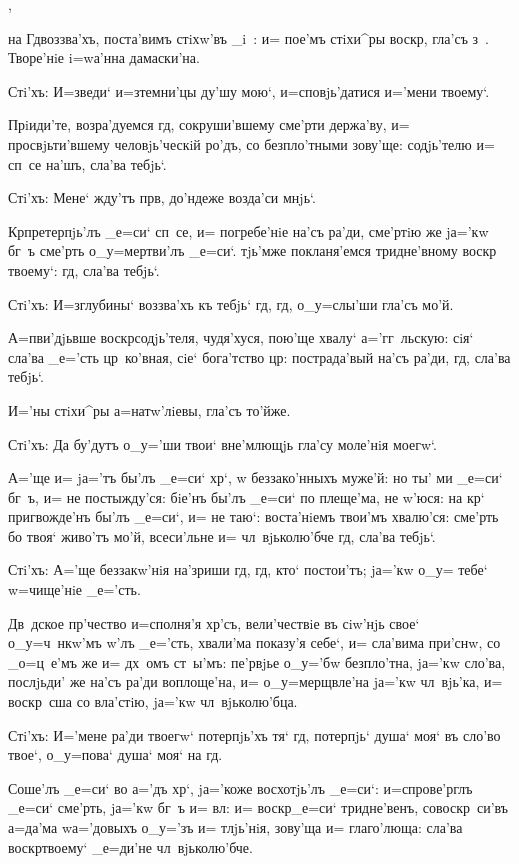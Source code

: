 ,

на Гд воззва'хъ, поста'вимъ стiхw'въ _i~: и= пое'мъ 
стiхи^ры воскр, гла'съ з~. Творе'нiе i=wа'нна 
дамаски'на.

Стi'хъ: И=зведи` и=з\ъ темни'цы ду'шу мою`, 
и=сповjь'датися и='мени твоему`.

Прiиди'те, возра'дуемся гд, сокруши'вшему сме'рти 
держа'ву, и= просвjьти'вшему человjь'ческiй ро'дъ, со 
безпло'тными зову'ще: содjь'телю и= сп~се на'шъ, сла'ва 
тебjь`.

Стi'хъ: Мене` жду'тъ прв, до'ндеже возда'си 
мнjь`.

Кр претерпjь'лъ _е=си` сп~се, и= погребе'нiе на'съ 
ра'ди, сме'ртiю же jа='кw бг~ъ сме'рть о_у=мертви'лъ 
_е=си`. тjь'мже покланя'емся тридне'вному воскр 
твоему`: гд, сла'ва тебjь`.

Стi'хъ: И=з\ъ глубины` воззва'хъ къ тебjь` гд, 
гд, о_у=слы'ши гла'съ мо'й.

А=п ви'дjьвше воскр содjь'теля, чудя'хуся, 
пою'ще хвалу` а='гг~льскую: сiя` сла'ва _е='сть 
цр~ко'вная, сiе` бога'тство цр: пострада'вый на'съ 
ра'ди, гд, сла'ва тебjь`.

И='ны стiхи^ры а=натw'лiевы, гла'съ то'йже.

Стi'хъ: Да бу'дутъ о_у='ши твои` вне'млющjь гла'су 
моле'нiя моегw`.

А='ще и= jа='тъ бы'лъ _е=си` хр`, w\т 
беззако'нныхъ муже'й: но ты' ми _е=си` бг~ъ, и= не 
постыжду'ся: бiе'нъ бы'лъ _е=си` по плеще'ма, не 
w'юся: на кр` пригвожде'нъ бы'лъ _е=си`, и= не 
таю`: воста'нiемъ твои'мъ хвалю'ся: сме'рть бо твоя` 
живо'тъ мо'й, всеси'льне и= чл~вjьколю'бче гд, сла'ва 
тебjь`.

Стi'хъ: А='ще беззакw'нiя на'зриши гд, гд, кто` 
постои'тъ; jа='кw о_у= тебе` w=чище'нiе _е='сть.

Дв~дское пр'чество и=сполня'я хр'съ, 
вели'чествiе въ сiw'нjь свое` о_у=ч~нкw'мъ w'лъ 
_е='сть, хвали'ма показу'я себе`, и= сла'вима при'снw, со 
_о=ц~е'мъ же и= дх~омъ ст~ы'мъ: пе'рвjье о_у='бw 
безпло'тна, jа='кw сло'ва, послjьди' же на'съ ра'ди 
воплоще'на, и= о_у=мерщвле'на jа='кw чл~вjь'ка, и= 
воскр~сша со вла'стiю, jа='кw чл~вjьколю'бца.

Стi'хъ: И='мене ра'ди твоегw` потерпjь'хъ тя` гд, 
потерпjь` душа` моя` въ сло'во твое`, о_у=пова` душа` 
моя` на гд.

Соше'лъ _е=си` во а='дъ хр`, jа='коже восхотjь'лъ 
_е=си`: и=спрове'рглъ _е=си` сме'рть, jа='кw бг~ъ и= 
вл: и= воскр _е=си` тридне'венъ, совоскр~си'въ 
а=да'ма w\т а='довыхъ о_у='зъ и= тлjь'нiя, зову'ща и= 
глаго'люща: сла'ва воскр твоему` _е=ди'не 
чл~вjьколю'бче.

